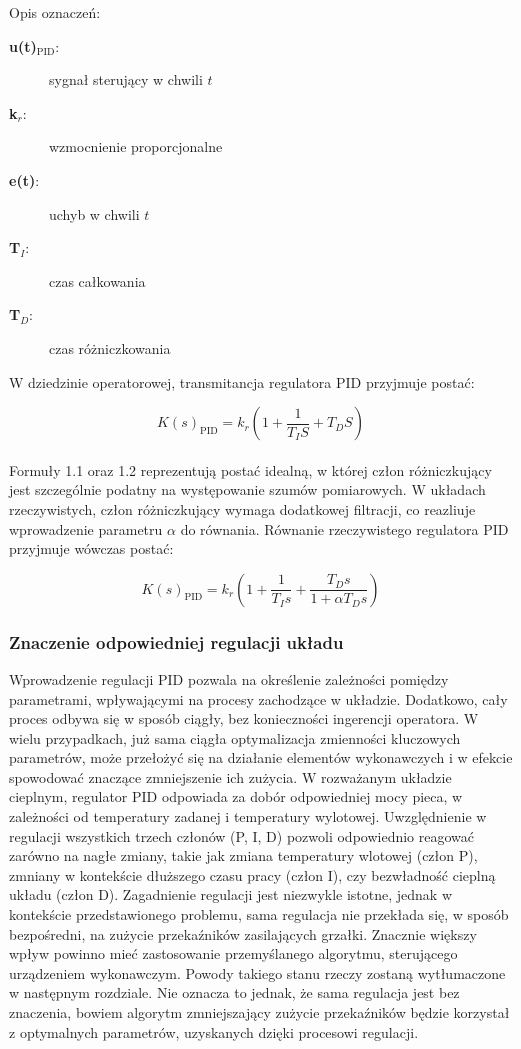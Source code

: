 \documentclass[a4paper,twoside,12pt]{book}
\begin{document}
\noindent Opis oznaczeń:
\begin{description}
	\item[\textbf{u(t)$_\text{PID}$}:] sygnał sterujący w chwili $t$
	\item[\textbf{k$_r$}:] wzmocnienie proporcjonalne
	\item[\textbf{e(t)}:] uchyb w chwili $t$
	\item[\textbf{T$_I$}:] czas całkowania
	\item[\textbf{T$_D$}:] czas różniczkowania
\end{description}

\noindent W dziedzinie operatorowej, transmitancja regulatora PID przyjmuje postać:

\begin{equation}
	K(s)_{\text{PID}} = k_r\left(1 + \frac{1}{T_I S} + T_D S\right)
\end{equation}\\

\noindent Formuły 1.1 oraz 1.2 reprezentują postać idealną, w której człon różniczkujący jest szczególnie podatny na występowanie szumów pomiarowych. W układach rzeczywistych, człon różniczkujący wymaga dodatkowej filtracji, co reazliuje wprowadzenie parametru $\alpha$ do równania. Równanie rzeczywistego regulatora PID przyjmuje wówczas postać:

\begin{equation}
	K(s)_{\text{PID}} = k_r\left(1 + \frac{1}{T_I s} + \frac{T_D s}{1 + \alpha T_D s}\right)
\end{equation}

\newpage
\subsubsection{Znaczenie odpowiedniej regulacji układu}
Wprowadzenie regulacji PID pozwala na określenie zależności pomiędzy parametrami, wpływającymi na procesy zachodzące w układzie. Dodatkowo, cały proces odbywa się w sposób ciągły, bez konieczności ingerencji operatora. W wielu przypadkach, już sama ciągła optymalizacja zmienności kluczowych parametrów, może przełożyć się na działanie elementów wykonawczych i w efekcie spowodować znaczące zmniejszenie ich zużycia. W rozważanym układzie cieplnym, regulator PID odpowiada za dobór odpowiedniej mocy pieca, w zależności od temperatury zadanej i temperatury wylotowej. Uwzględnienie w regulacji wszystkich trzech członów (P, I, D) pozwoli odpowiednio reagować zarówno na nagłe zmiany, takie jak zmiana temperatury wlotowej (człon P), zmniany w kontekście dłuższego czasu pracy (człon I), czy bezwładność cieplną układu (człon D). Zagadnienie regulacji jest niezwykle istotne, jednak w kontekście przedstawionego problemu, sama regulacja nie przekłada się, w sposób bezpośredni, na zużycie przekaźników zasilających grzałki. Znacznie większy wpływ powinno mieć zastosowanie przemyślanego algorytmu, sterującego urządzeniem wykonawczym. Powody takiego stanu rzeczy zostaną wytłumaczone w następnym rozdziale. Nie oznacza to jednak, że sama regulacja jest bez znaczenia, bowiem algorytm zmniejszający zużycie przekaźników będzie korzystał z optymalnych parametrów, uzyskanych dzięki procesowi regulacji.
\end{document}
